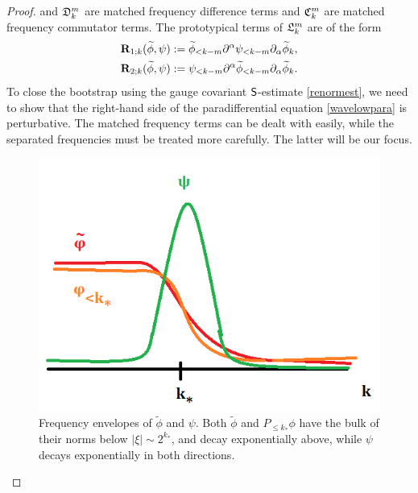 \begin{proof}
	and $\mathfrak D_k^m$ are matched frequency difference terms and $\mathfrak C_k^m$ are matched frequency commutator terms. The prototypical terms of $\mathfrak L_k^m$ are of the form
		\begin{align*}
			{\bf R}_{1;k} (\widetilde\phi, \psi)
				&:=\widetilde\phi_{< k - m} \partial^\alpha \psi_{< k - m} \partial_\alpha \widetilde \phi_k, \\
			{\bf R}_{2;k} (\widetilde\phi, \psi)
				&:= 	\psi_{< k - m} \partial^\alpha \widetilde \phi_{< k - m} \partial_\alpha \widetilde \phi_k . 
		\end{align*}
	 To close the bootstrap using the gauge covariant $\mathsf S$-estimate \eqref{renormest}, we need to show that the right-hand side of the paradifferential equation \eqref{wavelowpara} is perturbative. The matched frequency terms can be dealt with easily, while the separated frequencies must be treated more carefully. The latter will be our focus.  
	
\begin{figure}[h]
	\begin{center}
		\includegraphics{graphics/envelope}
		\caption{Frequency envelopes of $\widetilde \phi$ and $\psi$. Both $\widetilde \phi$ and $P_{\leq k_*} \phi$ have the bulk of their norms below $|\xi| \sim 2^{k_*}$, and decay exponentially above, while $\psi$ decays exponentially in both directions. }
	\end{center}
\end{figure}


\end{proof}
